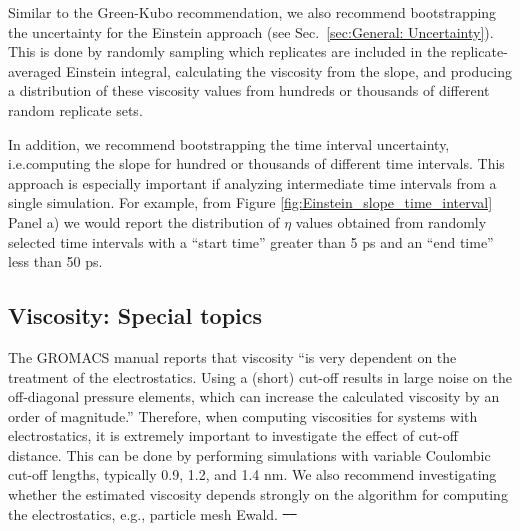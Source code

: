 \documentclass[9pt,bestpractices]{livecoms}
\providecommand{\DIFadd}[1]{{\protect\color{blue}\uwave{#1}}} %
\providecommand{\DIFdel}[1]{{\protect\color{red}\sout{#1}}}                      %
\providecommand{\DIFaddbegin}{} %
\providecommand{\DIFaddend}{} %
\providecommand{\DIFdelbegin}{} %
\providecommand{\DIFdelend}{} %
\begin{document}
Similar to the Green-Kubo recommendation, we also recommend bootstrapping the uncertainty for the Einstein approach (see Sec.\ \ref{sec:General: Uncertainty}). This is done by randomly sampling which replicates are included in the replicate-averaged Einstein integral, calculating the viscosity from the slope, and producing a distribution of these viscosity values from hundreds or thousands of different random replicate sets. 

In addition, we recommend bootstrapping the time interval uncertainty, i.e.\DIFaddbegin \DIFadd{, }\DIFaddend computing the slope for hundred or thousands of different time intervals. This approach is especially important if analyzing intermediate time intervals from a single simulation. For example, from Figure \ref{fig:Einstein_slope_time_interval} Panel a) we would report the distribution of $\eta$ values obtained from randomly selected time intervals with a ``start time'' greater than 5 ps and an ``end time'' less than 50 ps. 


\subsection{Viscosity: Special topics} \label{sec:Viscosity Special topics}

The GROMACS manual reports that viscosity ``is very dependent on the treatment of the electrostatics. Using a (short) cut-off results in large noise on the off-diagonal pressure elements, which can increase the calculated viscosity by an order of magnitude.'' \cite{GROMACS,Hess2002} Therefore, when computing viscosities for systems with electrostatics, it is extremely important to investigate the effect of cut-off distance. This can be done by performing simulations with variable Coulombic cut-off lengths, typically 0.9, 1.2, and 1.4 nm. We also recommend investigating whether the estimated viscosity depends strongly on the algorithm for computing the electrostatics, e.g., particle mesh Ewald. \DIFdelbegin \DIFdel{\mbox{%
\cite{GROMACS} 
}\hspace{0pt}%
}\DIFdelend \DIFaddbegin \DIFadd{\mbox{%
\cite{GROMACS,Darden1993} 
}\hspace{0pt}%
}\DIFaddend 
\end{document}
